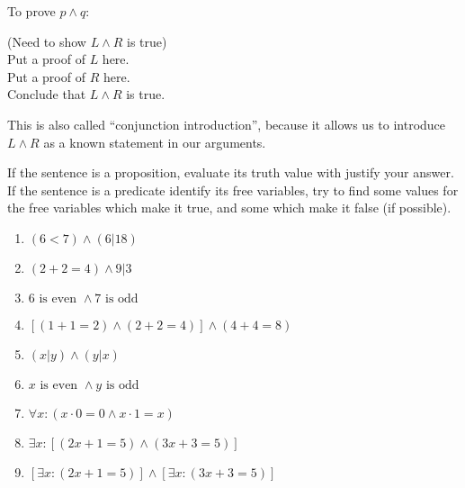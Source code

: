 To prove $p \wedge q$:

\begin{fitch*}
	\textrm{(Need to show $L \wedge R$ is true)}\\
	\textrm{Put a proof of $L$ here.}\\
	\textrm{Put a proof of $R$ here.}\\
	\textrm{Conclude that $L \wedge R$ is true.}\\
\end{fitch*}

This is also called ``conjunction introduction'', because it allows us to introduce $L \wedge R$ as a known statement in our arguments.

\begin{xca}
		If the sentence is a proposition, evaluate its truth value with justify your answer.  If the sentence is a predicate identify its free variables, try to find some values for the free variables which make it true, and some which make it false (if possible).
		
		\begin{enumerate}
				\item $(6 < 7 ) \wedge (6| 18)$
				\item $(2+2=4) \wedge 9|3$
				\item $6 \textrm{ is even } \wedge 7 \textrm{ is odd}$
				\item $[(1+1=2) \wedge (2+2 = 4)] \wedge (4+4 =8)$
				\item $(x|y) \wedge (y|x)$
				\item $x \textrm{ is even } \wedge y \textrm{ is odd}$ 
				\item $\forall x: (x \cdot 0 = 0 \wedge x \cdot 1 = x)$
				\item $\exists x: [(2x+1 = 5) \wedge (3x+3 = 5)]$
				\item $[\exists x: (2x+1 = 5)] \wedge [\exists x: (3x+3 = 5)]$
			\end{enumerate}
	\end{xca}

